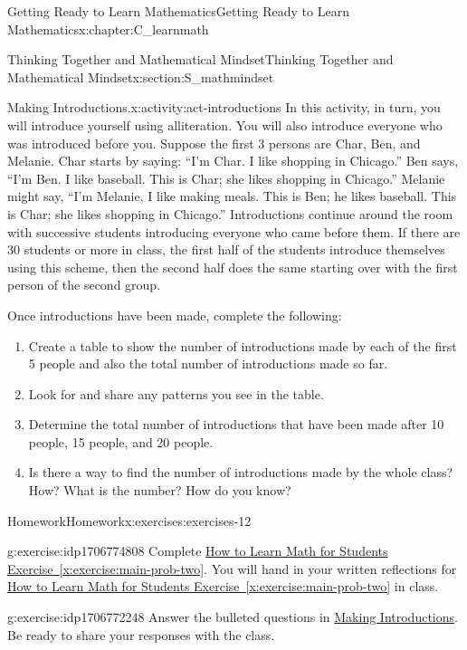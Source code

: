 \documentclass[oneside,10pt,]{book}
\newcommand{\xreffont}{\relax}
\numberwithin{equation}{chapter}
\begin{document}
\begin{chapterptx}{Getting Ready to Learn Mathematics}{}{Getting Ready to Learn Mathematics}{}{}{x:chapter:C_learnmath}
\begin{sectionptx}{Thinking Together and Mathematical Mindset}{}{Thinking Together and Mathematical Mindset}{}{}{x:section:S_mathmindset}
\begin{activity}{Making Introductions.}{x:activity:act-introductions}
In this activity, in turn, you will introduce yourself using alliteration. You will also introduce everyone who was introduced before you. Suppose the first 3 persons are Char, Ben, and Melanie. Char starts by saying: ``I'm Char. I like shopping in Chicago.'' Ben says, ``I'm Ben. I like baseball. This is Char; she likes shopping in Chicago.'' Melanie might say, ``I'm Melanie, I like making meals. This is Ben; he likes baseball. This is Char; she likes shopping in Chicago.'' Introductions continue around the room with successive students introducing everyone who came before them. If there are 30 students or more in class, the first half of the students introduce themselves using this scheme, then the second half does the same starting over with the first person of the second group.%
\par
Once introductions have been made, complete the following:%
\begin{enumerate}[font=\bfseries,label=(\alph*),ref=\alph*]
\item{}Create a table to show the number of introductions made by each of the first 5 people and also the total number of introductions made so far.%
\item{}Look for and share any patterns you see in the table.%
\item{}Determine the total number of introductions that have been made after 10 people, 15 people, and 20 people.%
\item{}Is there a way to find the number of introductions made by the whole class? How? What is the number? How do you know?%
\end{enumerate}
\end{activity}%
%
%
\typeout{************************************************}
\typeout{************************************************}
%
\begin{exercises-subsection}{Homework}{}{Homework}{}{}{x:exercises:exercises-12}
\begin{divisionexercise}{1}{}{}{g:exercise:idp1706774808}%
Complete \hyperref[x:exercise:main-prob-two]{How to Learn Math for Students Exercise~{\xreffont\ref{x:exercise:main-prob-two}}}. You will hand in your written reflections for \hyperref[x:exercise:main-prob-two]{How to Learn Math for Students Exercise~{\xreffont\ref{x:exercise:main-prob-two}}} in class.%
\end{divisionexercise}%
\begin{divisionexercise}{2}{}{}{g:exercise:idp1706772248}%
Answer the bulleted questions in \hyperref[x:activity:act-introductions]{Making Introductions}. Be ready to share your responses with the class.%

\end{divisionexercise}
\end{exercises-subsection}
\end{sectionptx}
\end{chapterptx}
\end{document}
